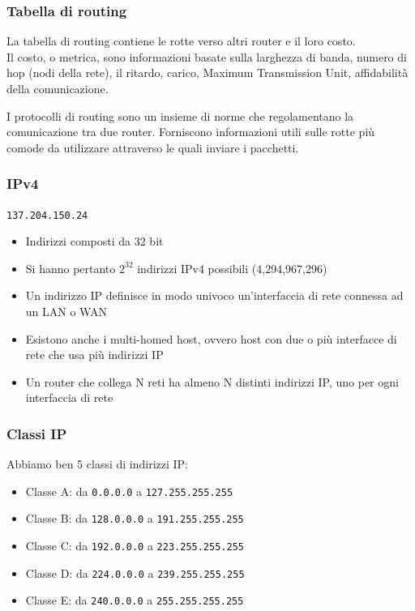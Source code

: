 \documentclass[aspectratio=169]{beamer}
\begin{document}
    \begin{frame}
        \frametitle{Tabella di routing}
        La tabella di routing contiene le rotte verso altri router e il loro costo.\\
        Il costo, o metrica, sono informazioni basate sulla larghezza di banda, numero di hop (nodi della rete), il ritardo, carico, Maximum Transmission Unit, affidabilità della comunicazione.\vskip 0.3cm
        
        I protocolli di routing sono un insieme di norme che regolamentano la comunicazione tra due router.
        Forniscono informazioni utili sulle rotte più comode da utilizzare attraverso le quali inviare i pacchetti.
    \end{frame}
     
    \begin{frame}
        \frametitle{IPv4}
        \begin{center}
            \texttt{137.204.150.24}
        \end{center}
        \begin{itemize}
            \item Indirizzi composti da 32 bit
            \item Si hanno pertanto $2^{32}$ indirizzi IPv4 possibili (4,294,967,296)
            \item Un indirizzo IP definisce in modo univoco un'interfaccia di rete connessa ad un LAN o WAN
            \item Esistono anche i multi-homed host, ovvero host con due o più interfacce di rete che usa più indirizzi IP
            \item Un router che collega N reti ha almeno N distinti indirizzi IP, uno per ogni interfaccia di rete
        \end{itemize}
    \end{frame}
    
    \begin{frame}
        \frametitle{Classi IP}
        Abbiamo ben 5 classi di indirizzi IP:
        \begin{itemize}
            \item Classe A: da \texttt{0.0.0.0} a \texttt{127.255.255.255}
            \item Classe B: da \texttt{128.0.0.0} a \texttt{191.255.255.255}
            \item Classe C: da \texttt{192.0.0.0} a \texttt{223.255.255.255}
            \item Classe D: da \texttt{224.0.0.0} a \texttt{239.255.255.255}
            \item Classe E: da \texttt{240.0.0.0} a \texttt{255.255.255.255}
        \end{itemize}
    
    \end{frame}
    
\end{document}

